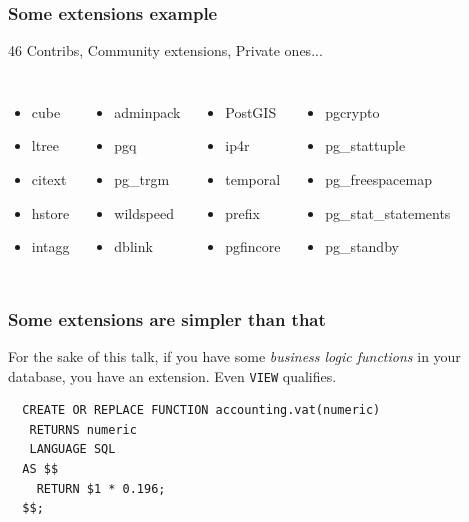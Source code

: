 \documentclass[english]{beamer}
\begin{document}
\begin{frame}[fragile]
  \frametitle{Some extensions example}

  \begin{center}
    46 Contribs, Community extensions, Private ones...
  \end{center}

\begin{columns}[c]

  \begin{itemize}
   \item cube
   \item ltree
   \item citext
   \item \alert{hstore}
   \item intagg
  \end{itemize}

  \begin{itemize}
   \item adminpack
   \item \alert{pgq}
   \item pg\_trgm
   \item wildspeed
   \item \alert{dblink}
  \end{itemize}

  \begin{itemize}
   \item \alert{PostGIS}
   \item ip4r
   \item temporal
   \item prefix
   \item pgfincore
  \end{itemize}

  \begin{itemize}
   \item pgcrypto
   \item pg\_stattuple
   \item pg\_freespacemap
   \item pg\_stat\_statements
   \item \alert{pg\_standby}
  \end{itemize}

\end{columns}
\end{frame}

\begin{frame}[fragile]
  \frametitle{Some extensions are simpler than that}

  For the sake of this talk, if you have some \textit{business logic
    functions} in your database, you have an extension. Even \texttt{VIEW}
  qualifies.

\begin{example}
\begin{verbatim}
  CREATE OR REPLACE FUNCTION accounting.vat(numeric)
   RETURNS numeric
   LANGUAGE SQL
  AS $$
    RETURN $1 * 0.196;
  $$;
\end{verbatim}
\end{example}
\end{frame}
\end{document}
